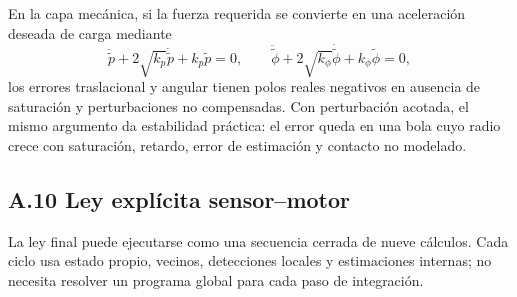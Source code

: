 En la capa mecánica, si la fuerza requerida se convierte en una aceleración deseada de
carga mediante
\[
  \ddot{\tilde p}+2\sqrt{k_p}\dot{\tilde p}+k_p\tilde p=0,
  \qquad
  \ddot{\tilde\phi}+2\sqrt{k_\phi}\dot{\tilde\phi}+k_\phi\tilde\phi=0,
\]
los errores traslacional y angular tienen polos reales negativos en ausencia de
saturación y perturbaciones no compensadas. Con perturbación acotada, el mismo argumento
da estabilidad práctica: el error queda en una bola cuyo radio crece con saturación,
retardo, error de estimación y contacto no modelado.

\subsection*{A.10 Ley explícita sensor--motor}

La ley final puede ejecutarse como una secuencia cerrada de nueve cálculos. Cada ciclo
usa estado propio, vecinos, detecciones locales y estimaciones internas; no necesita
resolver un programa global para cada paso de integración.

